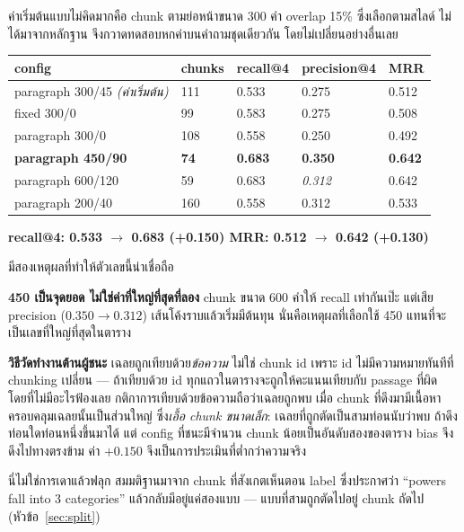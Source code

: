 \documentclass[11pt,a4paper]{article}
\newcommand{\thead}[1]{\textbf{#1}}
\begin{document}
ค่าเริ่มต้นแบบไม่คิดมากคือ chunk ตามย่อหน้าขนาด 300 คำ overlap 15\%
ซึ่งเลือกตามสไลด์ ไม่ได้มาจากหลักฐาน จึงกวาดทดสอบหกค่าบนคำถามชุดเดียวกัน
โดยไม่เปลี่ยนอย่างอื่นเลย

\begin{table}[H]
\centering
\small
\begin{tabular}{@{}L{5.6cm} C{1.8cm} C{2.1cm} C{2.3cm} C{1.8cm}@{}}
\toprule
\thead{config} & \thead{chunks} & \thead{recall@4} & \thead{precision@4} & \thead{MRR} \\
\midrule
paragraph 300/45 \emph{(ค่าเริ่มต้น)} & 111 & 0.533 & 0.275 & 0.512 \\
fixed 300/0 & 99 & 0.583 & 0.275 & 0.508 \\
paragraph 300/0 & 108 & 0.558 & 0.250 & 0.492 \\
\textbf{paragraph 450/90} & \textbf{74} & \textbf{0.683} & \textbf{0.350} & \textbf{0.642} \\
paragraph 600/120 & 59 & 0.683 & \textit{0.312} & 0.642 \\
paragraph 200/40 & 160 & 0.558 & 0.312 & 0.533 \\
\bottomrule
\end{tabular}
\end{table}

\begin{keybox}
\textbf{recall@4: 0.533 $\rightarrow$ 0.683 (+0.150) \qquad
MRR: 0.512 $\rightarrow$ 0.642 (+0.130)}
\end{keybox}

มีสองเหตุผลที่ทำให้ตัวเลขนี้น่าเชื่อถือ

\textbf{450 เป็นจุดยอด ไม่ใช่ค่าที่ใหญ่ที่สุดที่ลอง}\quad
chunk ขนาด 600 คำให้ recall เท่ากันเป๊ะ แต่เสีย precision
($0.350 \rightarrow 0.312$) เส้นโค้งราบแล้วเริ่มมีต้นทุน
นั่นคือเหตุผลที่เลือกใช้ 450 แทนที่จะเป็นเลขที่ใหญ่ที่สุดในตาราง

\textbf{วิธีวัดทำงานต้านผู้ชนะ}\quad
เฉลยถูกเทียบด้วย\emph{ข้อความ} ไม่ใช่ chunk id
เพราะ id ไม่มีความหมายทันทีที่ chunking เปลี่ยน ---
ถ้าเทียบด้วย id ทุกแถวในตารางจะถูกให้คะแนนเทียบกับ passage ที่ผิด
โดยที่ไม่มีอะไรฟ้องเลย กติกาการเทียบด้วยข้อความถือว่าเฉลยถูกพบ
เมื่อ chunk ที่ดึงมามีเนื้อหาครอบคลุมเฉลยนั้นเป็นส่วนใหญ่ ซึ่ง\emph{เอื้อ chunk ขนาดเล็ก}:
เฉลยที่ถูกตัดเป็นสามท่อนนับว่าพบ ถ้าดึงท่อนใดท่อนหนึ่งขึ้นมาได้
แต่ config ที่ชนะมีจำนวน chunk น้อยเป็นอันดับสองของตาราง
bias จึงดึงไปทางตรงข้าม ค่า $+0.150$ จึงเป็นการประเมินที่ต่ำกว่าความจริง

นี่ไม่ใช่การเดาแล้วฟลุก สมมติฐานมาจาก chunk ที่สังเกตเห็นตอน label
ซึ่งประกาศว่า “powers fall into 3 categories” แล้วกลับมีอยู่แค่สองแบบ ---
แบบที่สามถูกตัดไปอยู่ chunk ถัดไป (หัวข้อ~\ref{sec:split})
\end{document}
